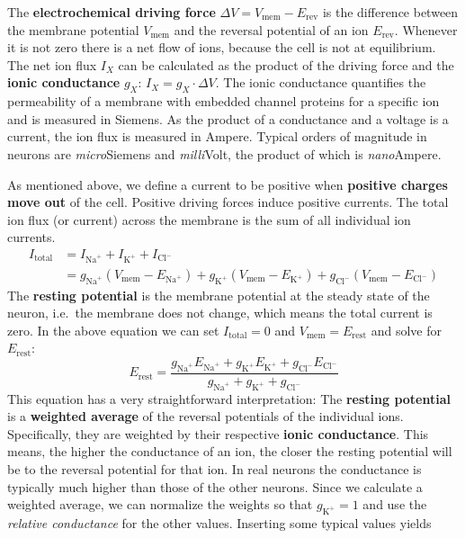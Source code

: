 The \textbf{electrochemical driving force} $\Delta V = V_\mathrm{mem} - E_\mathrm{rev}$ is the difference between the membrane potential $V_\mathrm{mem}$ and the reversal potential of an ion $E_\mathrm{rev}$. Whenever it is not zero there is a net flow of ions, because the cell is not at equilibrium. The net ion flux $I_X$ can be calculated as the product of the driving force and the \textbf{ionic conductance} $g_X$: $I_X=g_X \cdot \Delta V$. The ionic conductance quantifies the permeability of a membrane with embedded channel proteins for a specific ion and is measured in Siemens. As the product of a conductance and a voltage is a current, the ion flux is measured in Ampere. Typical orders of magnitude in neurons are \textit{micro}Siemens and \textit{milli}Volt, the product of which is \textit{nano}Ampere.

As mentioned above, we define a current to be positive when \textbf{positive charges move out} of the cell. Positive driving forces induce positive currents. The total ion flux (or current) across the membrane is the sum of all individual ion currents.
\begin{align*}
I_\mathrm{total} &= I_{\text{Na}^+} + I_{\text{K}^+} + I_{\text{Cl}^-} \\
 &= g_{\text{Na}^+} (V_\mathrm{mem} - E_{\text{Na}^+} ) + g_{\text{K}^+} (V_\mathrm{mem} - E_{\text{K}^+} ) + g_{\text{Cl}^-} (V_\mathrm{mem} - E_{\text{Cl}^-} )
\end{align*}
The \textbf{resting potential} is the membrane potential at the steady state of the neuron, i.e.\ the membrane does not change, which means the total current is zero. In the above equation we can set $I_\mathrm{total}=0$ and $V_\mathrm{mem}=E_\mathrm{rest}$ and solve for $E_\mathrm{rest}$:
\begin{equation}
E_\mathrm{rest} = \frac{g_{\text{Na}^+} E_{\text{Na}^+} + g_{\text{K}^+} E_{\text{K}^+} + g_{\text{Cl}^-} E_{\text{Cl}^-}}{g_{\text{Na}^+} + g_{\text{K}^+} + g_{\text{Cl}^-}}
\label{rest}
\end{equation}
This equation has a very straightforward interpretation: The \textbf{resting potential} is a \textbf{weighted average} of the reversal potentials of the individual ions. Specifically, they are weighted by their respective \textbf{ionic conductance}. This means, the higher the conductance of an ion, the closer the resting potential will be to the reversal potential for that ion. In real neurons the  conductance is typically much higher than those of the other neurons. Since we calculate a weighted average, we can normalize the weights so that $g_{\text{K}^+}=1$ and use the \textit{relative conductance} for the other values. Inserting some typical values yields
